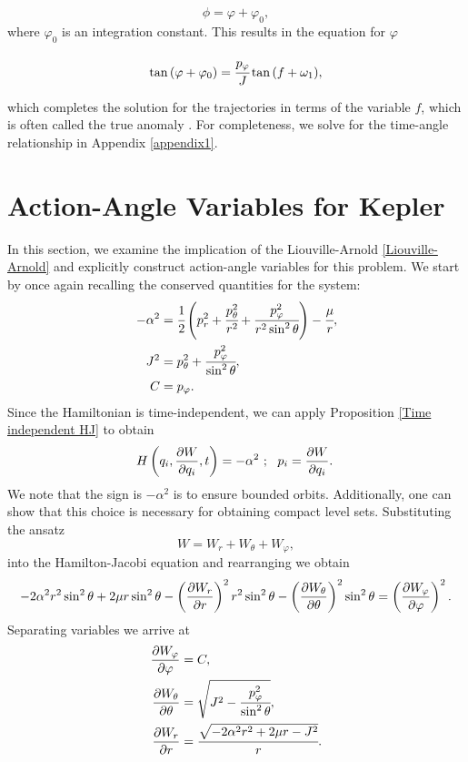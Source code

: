 \documentclass[12pt,oneside]{report}
\theoremstyle{definition}
\begin{document}
$$ \phi = \varphi + \varphi_{0}, $$
where $\varphi_{0}$ is an integration constant. This results in the equation for $\varphi$

\begin{equation}\label{2.15}
    \tan{(\varphi+\varphi_{0})} = \cfrac{p_{\varphi}}{J}\tan{(f+\omega_{1})},
\end{equation}

which completes the solution for the trajectories in terms of the variable $f$, which is often called the true anomaly \cite{o2008integrable}. For completeness, we solve for the time-angle relationship in Appendix \ref{appendix1}.


\section{Action-Angle Variables for Kepler}\label{Kepler Action angle}
In this section, we examine the implication of the Liouville-Arnold \autoref{Liouville-Arnold} and explicitly construct action-angle variables for this problem. We start by once again recalling the conserved quantities for the system:
\begin{align*}
    -\alpha^{2} &= \cfrac{1}{2} \left( p_{r}^{2}+\cfrac{p_{\theta}^{2}}{r^{2}}+\cfrac{p_{\varphi}^{2}}{r^{2}\sin^{2}{\theta}} \right) -\cfrac{\mu}{r},
    \\
    J^{2} &= p_{\theta}^{2} + \cfrac{p_{\varphi}^{2}}{\sin^{2}{\theta}},
    \\
     C &= p_{\varphi} .
\end{align*}
 Since the Hamiltonian is time-independent, we can apply Proposition \ref{Time independent HJ} to obtain
$$ H\left(q_{i},\displaystyle\frac{\partial W}{\partial q_{i}},t \right)  = -\alpha^{2} \   ; \ \ p_{i} = \displaystyle\frac{\partial W}{\partial q_{i}}.\ $$
We note that the sign is 
$-\alpha^{2}$ is to ensure bounded orbits. Additionally, one can show that this choice is necessary for obtaining compact level sets. Substituting the ansatz
$$W = W_{r}+W_{\theta}+W_{\varphi},$$
into the Hamilton-Jacobi equation and rearranging we obtain
$$ -2\alpha^{2}r^{2}\sin^{2}{\theta} + 2 \mu r\sin^{2}{\theta} - \left(\displaystyle\frac{\partial W_{r}}{\partial r}\right)^{2}r^{2}\sin^{2}{\theta} - \left( \displaystyle\frac{\partial W_{\theta}}{\partial \theta} \right)^{2}\sin^{2}{\theta} = \left( \displaystyle\frac{\partial W_{\varphi}}{\partial \varphi} \right)^{2}.$$
 Separating variables we arrive at 
 \begin{align}
     \displaystyle\frac{\partial W_{\varphi}}{\partial \varphi} &= C,
     \\
     \displaystyle\frac{\partial W_{\theta}}{\partial \theta} &= \sqrt{J^{2}-\cfrac{p_{\varphi}^{2}}{\sin^{2}{\theta}}},
     \\
      \displaystyle\frac{\partial W_{r}}{\partial r} &= \cfrac{\sqrt{-2\alpha^{2}r^{2}+2\mu r - J^{2}}}{r} .
 \end{align}
\end{document}
